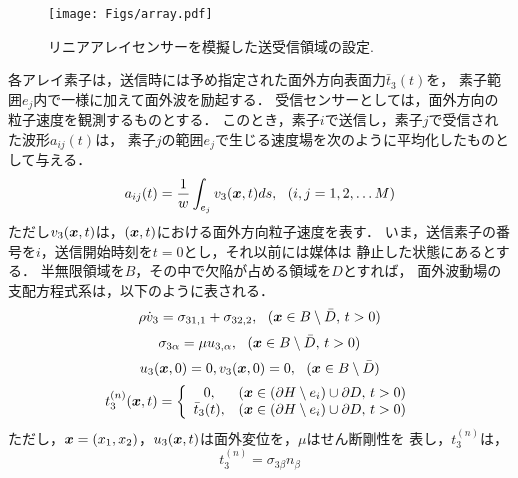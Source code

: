\begin{figure}[h]
	\begin{center}
	\texttt{[image: Figs/array.pdf]} 
	\end{center}
	\caption{リニアアレイセンサーを模擬した送受信領域の設定.} 
	\label{fig:linear_array}
\end{figure}
各アレイ素子は，送信時には予め指定された面外方向表面力$\bar{t}_3(t)$を，
素子範囲$e_j$内で一様に加えて面外波を励起する．
受信センサーとしては，面外方向の粒子速度を観測するものとする．
このとき，素子$i$で送信し，素子$j$で受信された波形$a_{ij}(t)$は，
素子$j$の範囲$e_j$で生じる速度場を次のように平均化したものとして与える．
\begin{equation}
	a_{ij}(t)=\frac{1}{w}\int_{e_j} v_3(\mbox{\boldmath $x$},t)ds, \ \ (i,j=1,2,\dots M)
	\label{eqn:WWW_001}
\end{equation}
ただし$v_3(\mbox{\boldmath $x$},t)$は，$(\mbox{\boldmath $x$},t)$における面外方向粒子速度を表す．
いま，送信素子の番号を$i$，送信開始時刻を$t=0$とし，それ以前には媒体は
静止した状態にあるとする．
半無限領域を$B$，その中で欠陥が占める領域を$D$とすれば，
面外波動場の支配方程式系は，以下のように表される．
\begin{equation}
	\rho \dot v_3 = \sigma_{31,1}+\sigma_{32,2}, 
	\ \ (\mbox{\boldmath $x$} \in B \setminus \bar{D},\, t>0)
	\label{eqn:WWW_002}
\end{equation}
\begin{equation}
	\sigma_{3\alpha}=\mu u_{3,\alpha}, 
	\ \ (\mbox{\boldmath $x$} \in B \setminus \bar{D},\, t>0)
	\label{eqn:WWW_003}
\end{equation}
\begin{equation}
	u_3(\mbox{\boldmath $x$},0)=0, v_3(\mbox{\boldmath $x$},0)=0, \ \ (\mbox{\boldmath $x$} \in B \setminus \bar{D})
	\label{eqn:WWW_003}
\end{equation}
\begin{equation}
	t_3^{(n)}(\mbox{\boldmath $x$},t)=
	\left\{
	\begin{array}{cc}
		0, & \left(\mbox{\boldmath $x$}\in (\partial H \setminus e_i ) \cup \partial D,\,  t>0 \right) \\
		\bar{t}_3(t), & \left(\mbox{\boldmath $x$}\in (\partial H\setminus e_i)  \cup \partial D,\, t>0 \right)\\
	\end{array}
	\right.
	\label{eqn:WWW_004}
\end{equation}
ただし，$\mbox{\boldmath $x$}=(x_1,x_2)$，$u_3(\mbox{\boldmath $x$},t)$は面外変位を，$\mu$はせん断剛性を
表し，$t^{(n)}_3$は，
\begin{equation}
	t^{(n)}_3= \sigma_{3\beta}n_\beta
	\label{eqn:WWW_004}
\end{equation}
